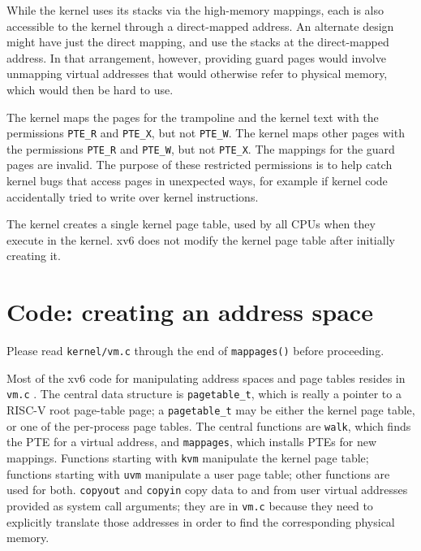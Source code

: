 While the kernel uses its stacks via the high-memory mappings, each
is also accessible to the kernel through a direct-mapped address. An
alternate design might have just the direct mapping, and use the
stacks at the direct-mapped address. In that arrangement, however,
providing guard pages would involve unmapping virtual addresses that
would otherwise refer to physical memory, which would then be hard to
use.

The kernel maps the pages for the trampoline and the kernel text with
the permissions
\lstinline{PTE_R}
and
\lstinline{PTE_X}, but not \lstinline{PTE_W}.
The kernel maps other pages with the permissions
\lstinline{PTE_R}
and
\lstinline{PTE_W},
but not \lstinline{PTE_X}.
The mappings for the guard pages are invalid.
The purpose of these restricted permissions is to help
catch kernel bugs that access pages in unexpected
ways, for example if kernel code accidentally tried
to write over kernel instructions.

The kernel creates a single kernel page table, used by all CPUs when
they execute in the kernel. xv6 does not modify the kernel page
table after initially creating it.

\section{Code: creating an address space}

Please read {\tt kernel/vm.c} through the end of {\tt mappages()}
before proceeding.

Most of the xv6 code for manipulating address spaces and
page tables resides in {\tt vm.c}
.
The central data structure is {\tt pagetable\_t}, which
is really a pointer to a RISC-V root page-table page;
a {\tt pagetable\_t} may be either the kernel
page table, or one of the per-process page tables.
The central functions are {\tt walk},
which finds the PTE for a virtual address,
and {\tt mappages}, which installs PTEs for new mappings.
Functions starting with {\tt kvm} manipulate
the kernel page table; functions starting with {\tt uvm}
manipulate a user page table; other functions are
used for both.
{\tt copyout} and {\tt copyin} copy data to and from
user virtual addresses provided as system call arguments;
they are in {\tt vm.c} because they need to explicitly
translate those addresses in order to find the corresponding
physical memory.


